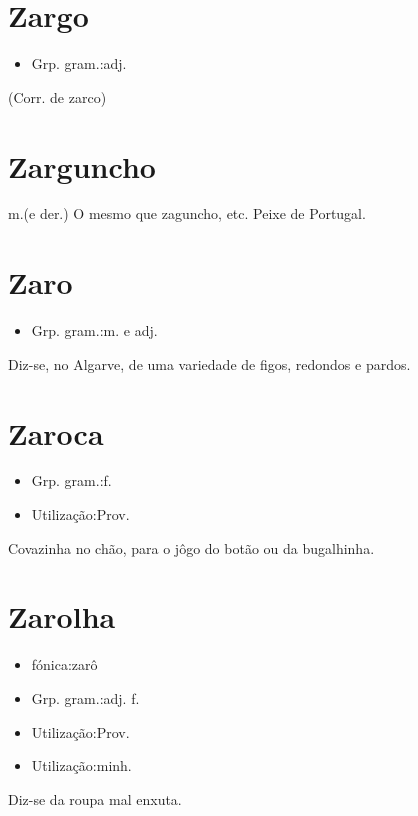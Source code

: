 \section{Zargo}
\begin{itemize}
\item {Grp. gram.:adj.}
\end{itemize}
(Corr. de \textunderscore zarco\textunderscore )
\section{Zarguncho}
\textunderscore m.\textunderscore  (e der.)
O mesmo que \textunderscore zaguncho\textunderscore , etc.
Peixe de Portugal.
\section{Zaro}
\begin{itemize}
\item {Grp. gram.:m.  e  adj.}
\end{itemize}
Diz-se, no Algarve, de uma variedade de figos, redondos e pardos.
\section{Zaroca}
\begin{itemize}
\item {Grp. gram.:f.}
\end{itemize}
\begin{itemize}
\item {Utilização:Prov.}
\end{itemize}
Covazinha no chão, para o jôgo do botão ou da bugalhinha.
\section{Zarolha}
\begin{itemize}
\item {fónica:zarô}
\end{itemize}
\begin{itemize}
\item {Grp. gram.:adj. f.}
\end{itemize}
\begin{itemize}
\item {Utilização:Prov.}
\end{itemize}
\begin{itemize}
\item {Utilização:minh.}
\end{itemize}
Diz-se da roupa mal enxuta.
